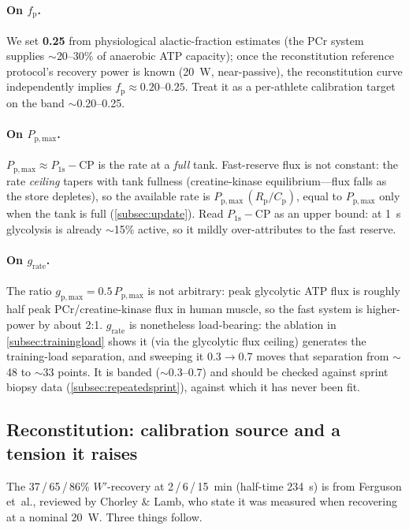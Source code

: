\documentclass[11pt,a4paper]{article}
\newcommand{\Wp}{\ensuremath{W'}}
\newcommand{\CP}{\ensuremath{\mathrm{CP}}}
\newcommand{\fp}{\ensuremath{f_{\mathrm p}}}
\newcommand{\Rp}{\ensuremath{R_{\mathrm p}}}
\newcommand{\Cp}{\ensuremath{C_{\mathrm p}}}
\newcommand{\Ppmax}{\ensuremath{P_{\mathrm{p,max}}}}
\newcommand{\grate}{\ensuremath{g_{\mathrm{rate}}}}
\newcommand{\gpmax}{\ensuremath{g_{\mathrm{p,max}}}}
\newcommand{\Pos}{\ensuremath{P_{1\mathrm s}}}
\begin{document}
\paragraph{On \fp.} We set \textbf{0.25} from physiological alactic-fraction estimates (the PCr system
supplies $\sim$20--30\% of anaerobic ATP capacity\citep{diPrampero1999,Bangsbo1990}); once the
reconstitution reference protocol's recovery power is known (20~W, near-passive), the reconstitution curve
independently implies $\fp \approx 0.20$--$0.25$. Treat it as a per-athlete calibration target on the band
$\sim$0.20--0.25.

\paragraph{On \Ppmax.} $\Ppmax \approx \Pos - \CP$ is the rate at a \emph{full} tank. Fast-reserve flux is
not constant: the rate \emph{ceiling} tapers with tank fullness (creatine-kinase equilibrium---flux falls
as the store depletes), so the available rate is $\Ppmax\,(\Rp/\Cp)$, equal to \Ppmax{} only when the tank
is full (\cref{subsec:update}). Read $\Pos - \CP$ as an upper bound: at 1~s glycolysis is already $\sim$15\%
active, so it mildly over-attributes to the fast reserve.

\paragraph{On \grate.} The ratio $\gpmax = 0.5\,\Ppmax$ is not arbitrary: peak glycolytic ATP flux is
roughly half peak PCr/creatine-kinase flux in human muscle,\citep{diPrampero1999,Parolin1999} so the fast
system is higher-power by about 2:1. \grate{} is nonetheless load-bearing: the ablation in
\cref{subsec:trainingload} shows it (via the glycolytic flux ceiling) generates the training-load
separation, and sweeping it 0.3$\rightarrow$0.7 moves that separation from $\sim$48 to $\sim$33 points. It
is banded ($\sim$0.3--0.7) and should be checked against sprint biopsy data (\cref{subsec:repeatedsprint}),
against which it has never been fit.

\subsection{Reconstitution: calibration source and a tension it raises}\label{subsec:recon}

The 37\,/\,65\,/\,86\% \Wp-recovery at 2\,/\,6\,/\,15~min (half-time \SI{234}{\second}) is from
Ferguson et~al.,\citep{Ferguson2010} reviewed by Chorley \& Lamb,\citep{ChorleyLamb2020} who state it was
measured when recovering at a nominal 20~W. Three things follow.
\end{document}
